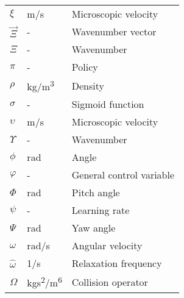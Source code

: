 \begin{longtable}{p{5cm}p{4cm}p{5cm}}
    $\xi$    		    & \si{m/s}        & Microscopic velocity \\
   	$\vec{\Xi}$			& \si{-}			& Wavenumber vector\\
 	$\Xi$				& \si{-}			& Wavenumber\\
    $\pi$				& \si{-}			& Policy \\
    $\rho$              & \si{kg/m\cubed}     & Density \\
    $\sigma$			& \si{-}			& Sigmoid function \\
    $\upsilon$			& \si{m/s}		& Microscopic velocity \\
    $\Upsilon$			& \si{-}			& Wavenumber \\
    $\phi$				& \si{rad}		& Angle \\
    $\varphi$			& \si{-}			& General control variable\\
    $\Phi$				& \si{rad}		& Pitch angle \\
    $\psi$				& \si{-}			& Learning rate \\
    $\Psi$				& \si{rad}		& Yaw angle \\
    $\omega$			& \si{rad/s}		& Angular velocity \\
    $\hat{\omega}$		& \si{1/s}		& Relaxation frequency \\
    $\Omega$            & \si{kgs\squared/m\tothe{6}}  & Collision operator \\
\end{longtable}

